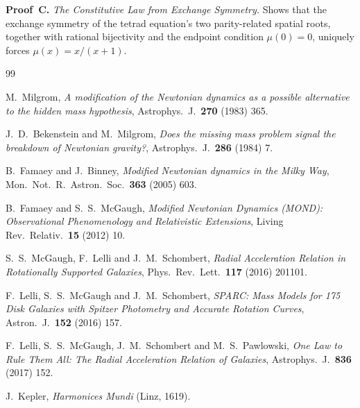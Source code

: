 \documentclass[twocolumn]{iopjournal}
\begin{document}
\medskip
\noindent
\textbf{Proof~C.}
\textit{The Constitutive Law from Exchange Symmetry.}\enspace
Shows that the exchange symmetry of the tetrad equation's two
parity-related spatial roots, together with rational bijectivity
and the endpoint condition $\mu(0) = 0$, uniquely forces
$\mu(x) = x/(x+1)$.


\begin{thebibliography}{99}

M.~Milgrom,
\textit{A modification of the Newtonian dynamics as a possible
alternative to the hidden mass hypothesis},
Astrophys.\ J.\ \textbf{270} (1983) 365.

J.~D.~Bekenstein and M.~Milgrom,
\textit{Does the missing mass problem signal the breakdown of
Newtonian gravity?},
Astrophys.\ J.\ \textbf{286} (1984) 7.

B.~Famaey and J.~Binney,
\textit{Modified Newtonian dynamics in the Milky Way},
Mon.\ Not.\ R.\ Astron.\ Soc.\ \textbf{363} (2005) 603.

B.~Famaey and S.~S.~McGaugh,
\textit{Modified Newtonian Dynamics (MOND): Observational
Phenomenology and Relativistic Extensions},
Living Rev.\ Relativ.\ \textbf{15} (2012) 10.

S.~S.~McGaugh, F.~Lelli and J.~M.~Schombert,
\textit{Radial Acceleration Relation in Rotationally Supported
Galaxies},
Phys.\ Rev.\ Lett.\ \textbf{117} (2016) 201101.

F.~Lelli, S.~S.~McGaugh and J.~M.~Schombert,
\textit{SPARC: Mass Models for 175 Disk Galaxies with Spitzer
Photometry and Accurate Rotation Curves},
Astron.\ J.\ \textbf{152} (2016) 157.

F.~Lelli, S.~S.~McGaugh, J.~M.~Schombert and M.~S.~Pawlowski,
\textit{One Law to Rule Them All: The Radial Acceleration
Relation of Galaxies},
Astrophys.\ J.\ \textbf{836} (2017) 152.

J.~Kepler,
\textit{Harmonices Mundi}
(Linz, 1619).

\end{thebibliography}
\end{document}
